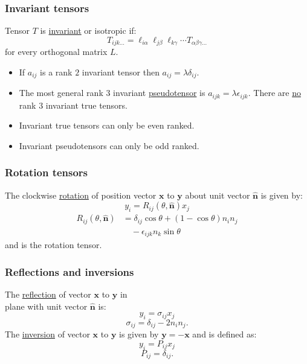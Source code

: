 \documentclass{article}
\begin{document}
\begin{multicols*}{3}
\subsubsection*{Invariant tensors}
Tensor $T$ is \underline{invariant} or isotropic if:
$$T_{ijk\dots}=\ell_{i\alpha}\ell_{j\beta}\ell_{k\gamma}
\cdots T_{\alpha\beta\gamma\dots}$$
for every orthogonal matrix $L$.
\begin{itemize}
    \item If $a_{ij}$ is a rank $2$
    invariant tensor then
    $a_{ij}=\lambda\delta_{ij}$.

    \item The most general rank $3$ invariant
    \underline{pseudotensor} is
    $a_{ijk}=\lambda\epsilon_{ijk}$.
    There are \underline{no} rank $3$
    invariant true tensors.

    \item Invariant true tensors can only be
    even ranked.

    \item Invariant pseudotensors can only be
    odd ranked.
\end{itemize}

\newpage

\subsubsection*{Rotation tensors}
The clockwise \underline{rotation} of position vector
$\boldsymbol{x}$ to $\boldsymbol{y}$
about unit vector $\hat{\boldsymbol{n}}$
is given by:
$$y_i=R_{ij}(\theta,\hat{\boldsymbol{n}})x_j$$
\begin{align*}
    R_{ij}(\theta,\hat{\boldsymbol{n}})
    &=\delta_{ij}\cos\theta+(1-\cos\theta)n_i n_j \\
    &\quad-\epsilon_{ijk}n_k\sin\theta
\end{align*}
and is the rotation tensor.

\subsubsection*{Reflections and inversions}
The \underline{reflection} of vector $\boldsymbol{x}$
to $\boldsymbol{y}$ in \\
plane with unit vector $\hat{\boldsymbol{n}}$ is:
$$y_i=\sigma_{ij}x_j$$
$$\sigma_{ij}=\delta_{ij}-2n_i n_j.$$
The \underline{inversion} of vector $\boldsymbol{x}$
to $\boldsymbol{y}$ is given by
$\boldsymbol{y}=-\boldsymbol{x}$
and is defined as:
$$y_i=P_{ij}x_j$$
$$P_{ij}=\delta_{ij}.$$


\end{multicols*}
\end{document}
